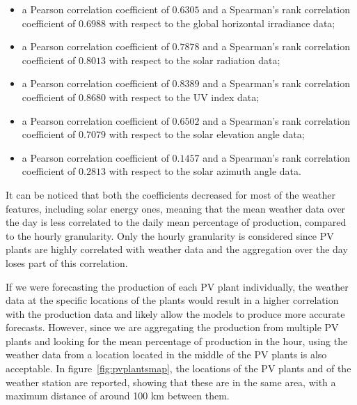 \begin{itemize}
  \item a Pearson correlation coefficient of $0.6305$ and a Spearman's rank correlation coefficient of $0.6988$ with respect to the global horizontal irradiance data;
  \item a Pearson correlation coefficient of $0.7878$ and a Spearman's rank correlation coefficient of $0.8013$ with respect to the solar radiation data;
  \item a Pearson correlation coefficient of $0.8389$ and a Spearman's rank correlation coefficient of $0.8680$ with respect to the UV index data;
  \item a Pearson correlation coefficient of $0.6502$ and a Spearman's rank correlation coefficient of $0.7079$ with respect to the solar elevation angle data;
  \item a Pearson correlation coefficient of $0.1457$ and a Spearman's rank correlation coefficient of $0.2813$ with respect to the solar azimuth angle data.
\end{itemize}
It can be noticed that both the coefficients decreased for most of the weather features, including solar energy ones, meaning that the mean weather data over the day is less correlated to the daily mean percentage of production, compared to the hourly granularity.
Only the hourly granularity is considered since PV plants are highly correlated with weather data and the aggregation over the day loses part of this correlation.

If we were forecasting the production of each PV plant individually, the weather data at the specific locations of the plants would result in a higher correlation with the production data and likely allow the models to produce more accurate forecasts.
However, since we are aggregating the production from multiple PV plants and looking for the mean percentage of production in the hour, using the weather data from a location located in the middle of the PV plants is also acceptable.
In figure~\ref{fig:pvplantsmap}, the locations of the PV plants and of the weather station are reported, showing that these are in the same area, with a maximum distance of around 100 km between them.

